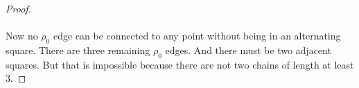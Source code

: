 \begin{proof}
\begin{figure}[H]
\begin{center}
\begin{tikzpicture}[scale=.8]
        \end{tikzpicture}
        \caption{}
      \end{center}
    \end{figure}

  \paragraph{}
  Now no $\rho_0$ edge can be connected to any point without being in an alternating square. There are three remaining $\rho_0$ edges. And there must be two adjacent squares. But that is impossible because there are not two chains of length at least 3.
\end{proof}
